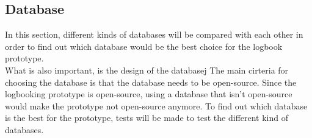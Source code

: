 \documentclass[paper=a4, fontsize=11pt,twoside]{scrartcl}	%
\begin{document}
\subsection{Database}
In this section, different kinds of databases will be compared with each other in order to find out which database would be the best choice for the logbook prototype. \\
What is also important, is the design of the databasej
The main cirteria for choosing the database is that the database needs to be open-source. Since the logbooking prototype is open-source, using a database that isn't open-source would make the prototype not open-source anymore. To find out which database is the best for the prototype, tests will be made to test the different kind of databases. \\
\end{document}
